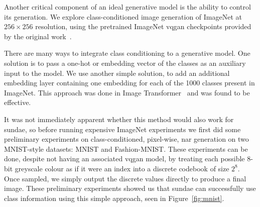 Another critical component of an ideal generative model is the ability to
control its generation. We explore class-conditioned image generation of
ImageNet at $256 \times 256$ resolution, using the pretrained ImageNet
\gls{vqgan} checkpoints provided by the original work~\cite{esser2021taming}. 

There are many ways to integrate class conditioning to a generative model. One
solution is to pass a one-hot or embedding vector of the classes as an auxiliary
input to the model. We use another simple solution, to add an additional
embedding layer containing one embedding for each of the 1000 classes present in
ImageNet. This approach was done in Image Transformer~\cite{parmar2018image} and
was found to be effective. 

It was not immediately apparent whether this method would also work for
\gls{sundae}, so before running expensive ImageNet experiments we first did some
preliminary experiments on class-conditioned, pixel-wise, \gls{nar} generation
on two MNIST-style datasets: MNIST and Fashion-MNIST. These experiments can be
done, despite not having an associated \gls{vqgan} model, by treating each
possible 8-bit greyscale colour as if it were an index into a discrete codebook
of size $2^8$. Once sampled, we simply output the discrete values directly to
produce a final image. These preliminary experiments showed us that \gls{sundae}
can successfully use class information using this simple approach, seen in
Figure~\ref{fig:mnist}.

